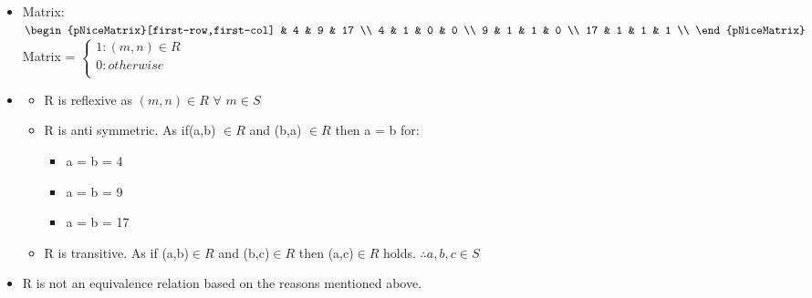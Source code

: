 \documentclass{article}
\begin{document}
\begin{enumerate}
\begin{itemize}
    \item Matrix:\\
        $\begin{pNiceMatrix}[first-row,first-col]
        & 4 & 9 & 17       \\
        4  & 1 & 0 & 0        \\ 
        9  & 1 & 1 & 0        \\
        17 & 1 & 1 & 1        \\
        \end{pNiceMatrix}$
        \hspace{1cm} Matrix = 
        $\begin{cases}
            1: (m,n)\in R\\
            0: otherwise\\  
        \end{cases}$ \\
    
    \item \begin{itemize}
       \item R is reflexive as $(m,n) \in R$ $\forall$ $m \in S$
       \item R is anti symmetric. As if(a,b) $\in R$ and (b,a) $\in R$ then a = b for: 
        \begin{itemize}
            \item[] a = b = 4 
            \item[] a = b = 9 
            \item[] a = b = 17
        \end{itemize}
        \item R is transitive. As if (a,b)$\in R$ and (b,c)$\in R$ then (a,c)$\in R$ holds. $\therefore a,b,c \in S$  
     \end{itemize}
    \item R is not an equivalence relation based on the reasons mentioned above.
    
\end{itemize}

\pagebreak %


\end{enumerate}
\end{document}
